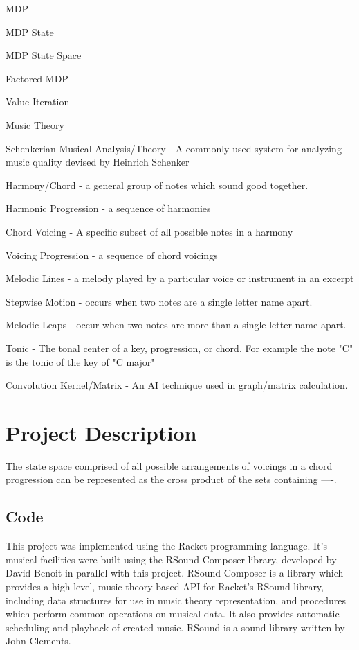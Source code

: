 \documentclass{chi2009}
\begin{document}
MDP

MDP State

MDP State Space

Factored MDP

Value Iteration

Music Theory

Schenkerian Musical Analysis/Theory - A commonly used system for analyzing music quality devised by Heinrich Schenker

Harmony/Chord - a general group of notes which sound good together.  

Harmonic Progression - a sequence of harmonies

Chord Voicing - A specific subset of all possible notes in a harmony

Voicing Progression - a sequence of chord voicings

Melodic Lines - a melody played by a particular voice or instrument in an excerpt

Stepwise Motion - occurs when two notes are a single letter name apart.

Melodic Leaps - occur when two notes are more than a single letter name apart.

Tonic - The tonal center of a key, progression, or chord.  For example the note "C" is the tonic of the key of "C major"

Convolution Kernel/Matrix - An AI technique used in graph/matrix calculation.

\section{Project Description}
The state space comprised of all possible arrangements of voicings in a chord progression can be represented as the cross product of the sets containing ----.


\subsection{Code}
This project was implemented using the Racket programming language.  It's musical facilities were built using the RSound-Composer library, developed by David Benoit in parallel with this project.  RSound-Composer is a library which provides a high-level, music-theory based API for Racket's RSound library, including data structures for use in music theory representation, and procedures which perform common operations on musical data.  It also provides automatic scheduling and playback of created music.  RSound is a sound library written by John Clements.
\end{document}
